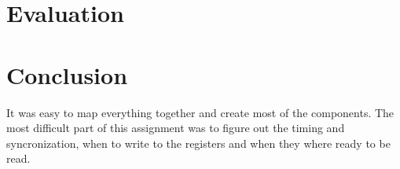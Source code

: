 \documentclass[10pt]{report}
\begin{document}
	\section*{Evaluation}


	\section*{Conclusion}


	It was easy to map everything together and create most of the components. The most difficult part of this assignment was to figure out the timing and syncronization, when to write to the registers and when they where ready to be read.
\end{document}
